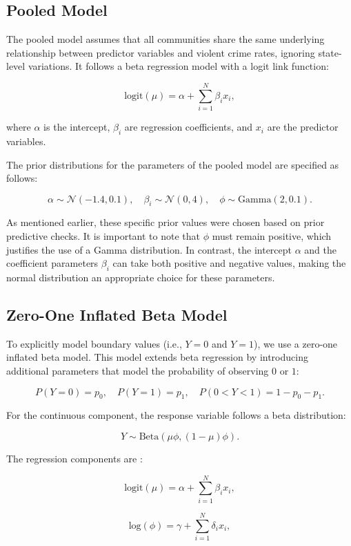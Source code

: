 \documentclass[12pt]{article}
\begin{document}
\subsection{Pooled Model}\label{pooled_model}

The pooled model assumes that all communities share the same underlying relationship between predictor variables and violent crime rates, ignoring state-level variations. It follows a beta regression model with a logit link function:

\[
\text{logit}(\mu) = \alpha + \sum_{i=1}^{N} \beta_i x_i,
\]

where \( \alpha \) is the intercept, \( \beta_i \) are regression coefficients, and \( x_i \) are the predictor variables.

The prior distributions for the parameters of the pooled model are specified as follows:

\[
\alpha \sim \mathcal{N}(-1.4, 0.1), \quad \beta_i \sim \mathcal{N}(0, 4), \quad \phi \sim \text{Gamma}(2, 0.1).
\]

As mentioned earlier, these specific prior values were chosen based on prior predictive checks. It is important to note that \( \phi \) must remain positive, which justifies the use of a Gamma distribution. In contrast, the intercept \( \alpha \) and the coefficient parameters \( \beta_i \) can take both positive and negative values, making the normal distribution an appropriate choice for these parameters.


\subsection{Zero-One Inflated Beta Model}

To explicitly model boundary values (i.e., \( Y = 0 \) and \( Y = 1 \)), we use a zero-one inflated beta model. This model extends beta regression by introducing additional parameters that model the probability of observing \( 0 \) or \( 1 \):

\[
P(Y = 0) = p_0, \quad P(Y = 1) = p_1, \quad P(0 < Y < 1) = 1 - p_0 - p_1.
\]

For the continuous component, the response variable follows a beta distribution:

\[
Y \sim \text{Beta}(\mu \phi, (1 - \mu) \phi).
\]

The regression components are \parencite{heiss2024zoib}:

\[
\text{logit}(\mu) = \alpha + \sum_{i=1}^{N} \beta_i x_i,
\]

\[
\text{log}(\phi) = \gamma + \sum_{i=1}^{N} \delta_i x_i,
\]
\end{document}

